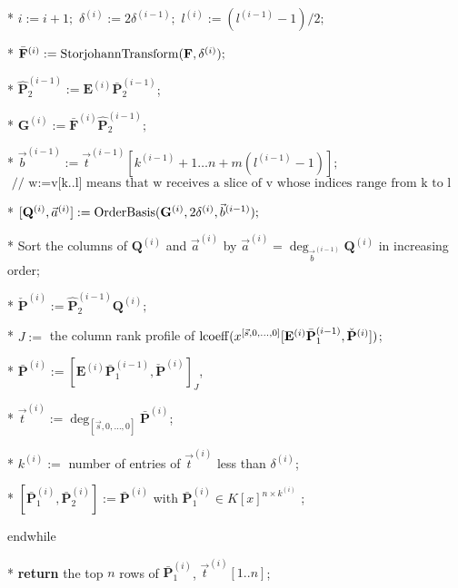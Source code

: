 \begin{algorithm}[t]
\begin{algor}[1]
\item [{{{*}}}] $i:=i+1;$ $\delta^{\left(i\right)}:=2\delta^{\left(i-1\right)};$
$l^{\left(i\right)}:=(l^{\left(i-1\right)}-1)/2;$ 
\item [{{{*}}}] $\bar{\mathbf{F}}^{\left(i\right)}:=\StorjohannTransform(\mathbf{F},\delta^{\left(i\right)});$ 
\item [{{{*}}}] $\hat{\mathbf{P}}_{2}^{\left(i-1\right)}:=\mathbf{E}^{\left(i\right)}\bar{\mathbf{P}}_{2}^{\left(i-1\right)}$;
\item [{{{*}}}] \label{line:matrixProduct1}$\mathbf{G}^{\left(i\right)}:=\bar{\mathbf{F}}^{\left(i\right)}\hat{\mathbf{P}}_{2}^{\left(i-1\right)};$ 
\item [{{{*}}}] $\vec{b}^{\left(i-1\right)}:=\vec{t}^{\left(i-1\right)}[k^{\left(i-1\right)}+1\dots n+m(l^{\left(i-1\right)}-1)];$
\\
$\mbox{ // w:=v[k..l] means that w receives a slice of v whose indices range from k to l}$
\item [{{{*}}}] \label{line:orderBasisComputation}$[\mathbf{Q}^{\left(i\right)},\vec{a}^{\left(i\right)}]:=\mab(\mathbf{G}^{\left(i\right)},2\delta^{\left(i\right)},\vec{b}^{\left(i-1\right)});$ 
\item [{{{*}}}] Sort the columns of $\mathbf{Q}^{\left(i\right)}$ and
$\vec{a}^{\left(i\right)}$ by $\vec{a}^{\left(i\right)}=\deg_{\vec{b}^{\left(i-1\right)}}\mathbf{Q}^{\left(i\right)}$
in increasing order; 
\item [{{{*}}}] \label{line:matrixProduct2}$\check{\mathbf{P}}^{\left(i\right)}:=\hat{\mathbf{P}}_{2}^{\left(i-1\right)}\mathbf{Q}^{\left(i\right)};$ 
\item [{{{*}}}] \label{line:LSP}$J:=$ the column rank profile of $\operatorname{lcoeff}(x^{\left[\vec{s},0,\dots,0\right]}[\mathbf{E}^{\left(i\right)}\bar{\mathbf{P}}_{1}^{\left(i-1\right)},\check{\mathbf{P}}^{\left(i\right)}])$; 
\item [{{*}}] $\bar{\mathbf{P}}^{\left(i\right)}:=[\mathbf{E}^{\left(i\right)}\bar{\mathbf{P}}_{1}^{\left(i-1\right)},\check{\mathbf{P}}^{\left(i\right)}]_{J}$,
\item [{{*}}] $\vec{t}^{\left(i\right)}:=\deg_{\left[\vec{s},0,\dots,0\right]}\bar{\mathbf{P}}^{\left(i\right)}$; 
\item [{{{*}}}] $k^{\left(i\right)}:=$ number of entries of $\vec{t}^{\left(i\right)}$
less than $\delta^{\left(i\right)}$;
\item [{{*}}] $[\bar{\mathbf{P}}_{1}^{\left(i\right)},\bar{\mathbf{P}}_{2}^{\left(i\right)}]:=\bar{\mathbf{P}}^{\left(i\right)}$
with $\bar{\mathbf{P}}_{1}^{\left(i\right)}\in K\left[x\right]^{n\times k^{\left(i\right)}}$
;
\item [{{endwhile}}] ~ 
\item [{{{*}}}] \textbf{return} the top $n$ rows of $\bar{\mathbf{P}}_{1}^{\left(i\right)}$,
$\vec{t}^{\left(i\right)}\left[1..n\right]$; \end{algor}
\end{algorithm}


